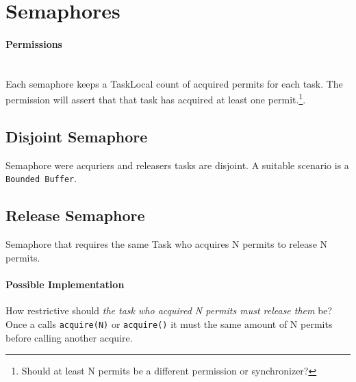 \documentclass[9pt, twoside, a4paper]{article}
\begin{document}

    \section{Semaphores}
    \paragraph*{Permissions} ~\\
    Each semaphore keeps a TaskLocal count of acquired permits for each task. The permission will assert
    that that task has acquired at least one permit.\footnote{Should at least N permits be a different
    permission or synchronizer?}.

    \subsection{Disjoint Semaphore}
    Semaphore were acquriers and releasers tasks are disjoint. A suitable scenario is a \lstinline{Bounded Buffer}.

    \subsection{Release Semaphore}
    Semaphore that requires the same Task who acquires N permits to release N permits.

    \paragraph*{Possible Implementation}
    How restrictive should \textit{the task who acquired N permits must release them} be?
    Once a calls \lstinline{acquire(N)} or \lstinline{acquire()} it must the same amount of
    N permits before calling another acquire.

    \newpage
    \printglossary
\end{document}
